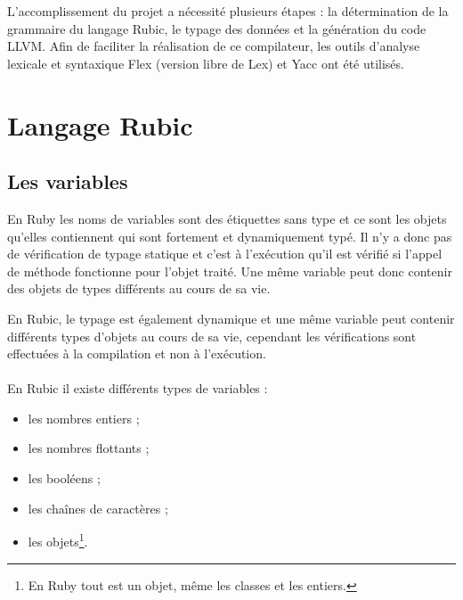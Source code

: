 \documentclass[12pt]{article}
\begin{document}
L'accomplissement du projet a nécessité plusieurs étapes : la détermination de
la grammaire du langage Rubic, le typage des données et la génération du code
LLVM.
Afin de faciliter la réalisation de ce compilateur, les outils d'analyse
lexicale et syntaxique Flex (version libre de Lex) et Yacc ont été utilisés.

\section{Langage Rubic}

\subsection{Les variables}

En Ruby les noms de variables sont des étiquettes sans type et ce sont les
objets qu'elles contiennent qui sont fortement et dynamiquement typé. Il n'y a
donc pas de vérification de typage statique et c'est à l'exécution qu'il est
vérifié si l'appel de méthode fonctionne pour l'objet traité. Une même
variable peut donc contenir des objets de types différents au cours de sa vie.

En Rubic, le typage est également dynamique et une même variable peut
contenir différents types d'objets au cours de sa vie, cependant les
vérifications sont effectuées à la compilation et non à l'exécution.

\paragraph{}
En Rubic il existe différents types de variables :
\begin{itemize}
    \item les nombres entiers ;
    \item les nombres flottants ;
    \item les booléens ;
    \item les chaînes de caractères ;
    \item les objets\footnote{En Ruby tout est un objet, même les classes et
        les entiers.}.
\end{itemize}
\end{document}
